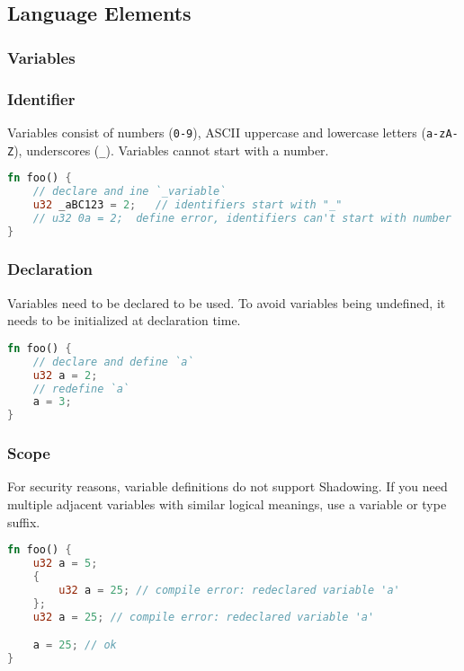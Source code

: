 \subsection{Language Elements}\label{section: ola-lang-language-elements}


\subsubsection{Variables}

\subsubsection*{Identifier}

Variables consist of numbers (\texttt{0-9}), ASCII uppercase and lowercase letters (\texttt{a-zA-Z}), underscores (\texttt{\_}).
Variables cannot start with a number.

\begin{lstlisting}[language=rust]
fn foo() {
    // declare and ine `_variable`
    u32 _aBC123 = 2;   // identifiers start with "_"
    // u32 0a = 2;  define error, identifiers can't start with number
}
\end{lstlisting}

\subsubsection*{Declaration}

Variables need to be declared to be used. To avoid variables being undefined, it needs to be initialized at declaration time. 

\begin{lstlisting}[language=rust]
fn foo() {
    // declare and define `a`
    u32 a = 2;
    // redefine `a`
    a = 3;
}
\end{lstlisting}

\subsubsection*{Scope}

For security reasons, variable definitions do not support Shadowing. 
If you need multiple adjacent variables with similar logical meanings, use a variable or type suffix.

\begin{lstlisting}[language=rust]
fn foo() {
    u32 a = 5;
    {        
        u32 a = 25; // compile error: redeclared variable 'a'
    };    
    u32 a = 25; // compile error: redeclared variable 'a'

    a = 25; // ok
}
\end{lstlisting}

